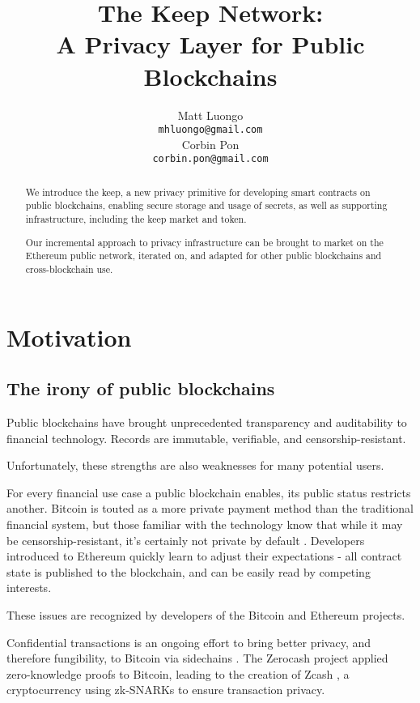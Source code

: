 \documentclass[11pt]{article}
\title{The Keep Network:\protect\\A Privacy Layer for Public Blockchains}
\author{Matt Luongo \\
  {\tt mhluongo@gmail.com} \\\And
  Corbin Pon \\
  {\tt corbin.pon@gmail.com} \\}
\date{}
\begin{document}
 \maketitle \begin{abstract}

  We introduce the keep, a new privacy primitive for developing smart
  contracts on public blockchains, enabling secure storage and usage
  of secrets, as well as supporting infrastructure, including the keep
  market and token.

  Our incremental approach to privacy infrastructure can be brought
  to market on the Ethereum public network, iterated on, and adapted
  for other public blockchains and cross-blockchain use.

\end{abstract}

\section{Motivation}

\subsection{The irony of public blockchains}

Public blockchains have brought unprecedented transparency and
auditability to financial technology. Records are immutable,
verifiable, and censorship-resistant.

Unfortunately, these strengths are also weaknesses for many potential
users.

For every financial use case a public blockchain enables, its public
status restricts another. Bitcoin is touted as a more private payment
method than the traditional financial system, but those familiar with
the technology know that while it may be censorship-resistant, it's
certainly not private by default \cite{bitcoinPrivacy}. Developers
introduced to Ethereum quickly learn to adjust their expectations
\cite{ethereumStackexchange}- all contract state is published to the
blockchain, and can be easily read by competing interests.

These issues are recognized by developers of the Bitcoin and Ethereum
projects.

Confidential transactions \cite{confidentialTransactions} is an
ongoing effort to bring better privacy, and therefore fungibility, to
Bitcoin via sidechains \cite{confidentialTransactionsElements}. The
Zerocash project \cite{zerocash} applied zero-knowledge proofs to
Bitcoin, leading to the creation of Zcash \cite{zcash}, a
cryptocurrency using zk-SNARKs to ensure transaction privacy.
\end{document}
